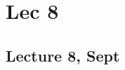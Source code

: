 \documentclass[12pt]{report}
\theoremstyle{definition}
\theoremstyle{remark}
\numberwithin{equation}{section}
\theoremstyle{definition}
\begin{document}
\chapter{Lec 8}
\section*{Lecture 8, Sept }
\label{sec:7}
\end{document}
